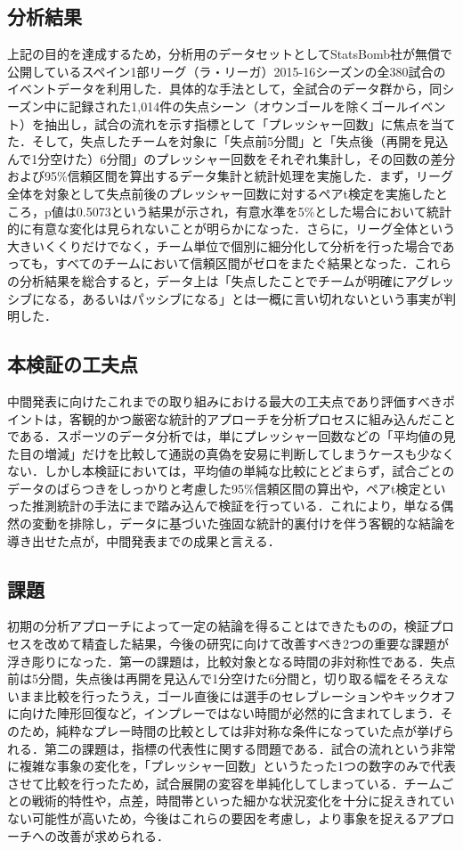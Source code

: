 \documentclass[11pt]{ujarticle} %
\begin{document}
\subsection{分析結果}
上記の目的を達成するため，分析用のデータセットとしてStatsBomb社が無償で公開しているスペイン1部リーグ（ラ・リーガ）2015-16シーズンの全380試合のイベントデータ\cite{ref:statsbomb}を利用した．具体的な手法として，全試合のデータ群から，同シーズン中に記録された1{,}014件の失点シーン（オウンゴールを除くゴールイベント）を抽出し，試合の流れを示す指標として「プレッシャー回数」に焦点を当てた．そして，失点したチームを対象に「失点前5分間」と「失点後（再開を見込んで1分空けた）6分間」のプレッシャー回数をそれぞれ集計し，その回数の差分および95\%信頼区間を算出するデータ集計と統計処理を実施した．まず，リーグ全体を対象として失点前後のプレッシャー回数に対するペアt検定を実施したところ，p値は0.5073という結果が示され，有意水準を5\%とした場合において統計的に有意な変化は見られないことが明らかになった．さらに，リーグ全体という大きいくくりだけでなく，チーム単位で個別に細分化して分析を行った場合であっても，すべてのチームにおいて信頼区間がゼロをまたぐ結果となった．これらの分析結果を総合すると，データ上は「失点したことでチームが明確にアグレッシブになる，あるいはパッシブになる」とは一概に言い切れないという事実が判明した．

\subsection{本検証の工夫点}
中間発表に向けたこれまでの取り組みにおける最大の工夫点であり評価すべきポイントは，客観的かつ厳密な統計的アプローチを分析プロセスに組み込んだことである．スポーツのデータ分析では，単にプレッシャー回数などの「平均値の見た目の増減」だけを比較して通説の真偽を安易に判断してしまうケースも少なくない．しかし本検証においては，平均値の単純な比較にとどまらず，試合ごとのデータのばらつきをしっかりと考慮した95\%信頼区間の算出や，ペアt検定といった推測統計の手法にまで踏み込んで検証を行っている．これにより，単なる偶然の変動を排除し，データに基づいた強固な統計的裏付けを伴う客観的な結論を導き出せた点が，中間発表までの成果と言える．

\subsection{課題}
初期の分析アプローチによって一定の結論を得ることはできたものの，検証プロセスを改めて精査した結果，今後の研究に向けて改善すべき2つの重要な課題が浮き彫りになった．第一の課題は，比較対象となる時間の非対称性である．失点前は5分間，失点後は再開を見込んで1分空けた6分間と，切り取る幅をそろえないまま比較を行ったうえ，ゴール直後には選手のセレブレーションやキックオフに向けた陣形回復など，インプレーではない時間が必然的に含まれてしまう．そのため，純粋なプレー時間の比較としては非対称な条件になっていた点が挙げられる．第二の課題は，指標の代表性に関する問題である．試合の流れという非常に複雑な事象の変化を，「プレッシャー回数」というたった1つの数字のみで代表させて比較を行ったため，試合展開の変容を単純化してしまっている．チームごとの戦術的特性や，点差，時間帯といった細かな状況変化を十分に捉えきれていない可能性が高いため，今後はこれらの要因を考慮し，より事象を捉えるアプローチへの改善が求められる．
\end{document}

